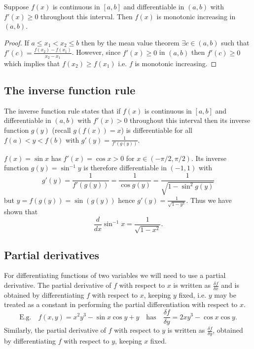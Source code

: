 \documentclass[10pt, a4paper]{article}
\begin{document}
\begin{proposition}
    Suppose $f(x)$ is continuous in $[a, b]$ and differentiable in $(a, b)$ with $f'(x) \geq 0$ throughout this interval.
    Then $f(x)$ is monotonic increasing in $(a, b)$.
    \begin{proof}
        If $a \leq x_1 < x_2 \leq b$ then by the mean value theorem $\exists c \in (a, b)$ such that $f'(c) = \frac{f(x_2) - f(x_1)}{x_2 - x_1}$.
        However, since $f'(x) \geq 0$ in $(a, b)$ then $f'(c) \geq 0$ which implies that $f(x_2) \geq f(x_1)$ i.e. $f$ is monotonic increasing.
    \end{proof}
\end{proposition}

\subsection{The inverse function rule}
The inverse function rule states that if $f(x)$ is continuous in $[a, b]$ and differentiable in $(a, b)$ with $f'(x) > 0$ throughout this interval then its inverse function $g(y)$ (recall $g(f(x)) = x$) is differentiable for all $f(a) < y < f(b)$ with $g'(y) = \frac{1}{f'(g(y))}$.

\begin{example}
    $f(x) = \sin x$ has $f'(x) = \cos x > 0$ for $x \in (-\pi / 2, \pi / 2)$.
    Its inverse function $g(y) = \sin^{-1}y$ is therefore differentiable in $(-1, 1)$ with
    \[
    g'(y) = \frac{1}{f'(g(y))} = \frac{1}{\cos g(y)} = \frac{1}{\sqrt{1 - \sin ^ 2 g(y)}}
    \]
    but $y = f(g(y)) = \sin (g(y))$ hence $g'(y) = \frac{1}{\sqrt{1 - y ^ 2}}$.
    Thus we have shown that
    \[
    \frac{d}{dx}\sin^{-1}x = \frac{1}{\sqrt{1 - x ^ 2}}.
    \]
\end{example}

\subsection{Partial derivatives}

For differentiating functions of two variables we will need to use a partial derivative.
The partial derivative of $f$ with respect to $x$ is written as $\frac{\delta f}{\delta x}$ and is obtained by differentiating $f$ with respect to $x$,
keeping $y$ fixed, i.e. $y$ may be treated as a constant in performing the partial differentiation with respect to $x$.
\[
\text{E.g.}\quad f(x, y) = x ^ 2 y ^ 3 - \sin x \cos y + y \quad\text{has}\quad\frac{\delta f}{\delta y} = 2xy ^ 3 - \cos x \cos y.
\]
Similarly, the partial derivative of $f$ with respect to $y$ is written as $\frac{\delta f}{\delta y}$,
obtained by differentiating $f$ with respect to $y$, keeping $x$ fixed.
\end{document}
